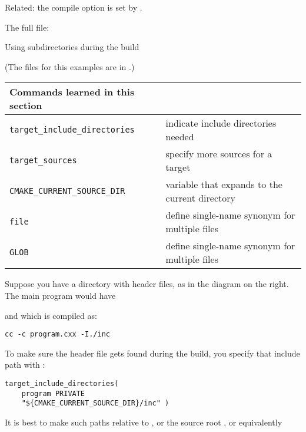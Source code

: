 Related: the  compile option
is set by .

The full  file:
%


\newpage
{} {Using subdirectories during the build}

(The files for this examples are in .)

\begin{tabular}{lp{3in}}
  \toprule
  Commands learned in this section\\
  \midrule
  \lstinline+target_include_directories+&indicate include directories needed\\
  \lstinline+target_sources+&specify more sources for a target\\
  \lstinline+CMAKE_CURRENT_SOURCE_DIR+&variable that expands to the current directory\\
  \lstinline+file+&define single-name synonym for multiple files\\
  \lstinline+GLOB+&define single-name synonym for multiple files\\
  \bottomrule
\end{tabular}

\begin{floatingfigure}[r]{2.5in}
  \begin{minipage}{2.5in}
  \end{minipage}
\end{floatingfigure}
%
Suppose you have a directory with header files,
as in the diagram on the right.
The main program would have
\begingroup\lstset{language=C++}

\endgroup
and which is compiled as:
\begin{verbatim}
cc -c program.cxx -I./inc
\end{verbatim}
To make sure the header file gets found during the build,
you specify that include path with :
\begin{lstlisting}
target_include_directories(
	program PRIVATE
	"${CMAKE_CURRENT_SOURCE_DIR}/inc" )
\end{lstlisting}
It is best to make such paths relative to
,
or the source root ,
or equivalently 

